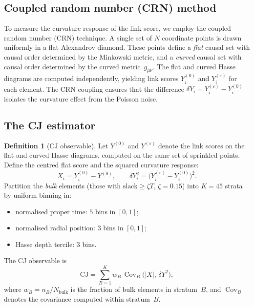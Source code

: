 \documentclass[12pt,a4paper]{article}
\theoremstyle{plain}
\theoremstyle{definition}
\newtheorem{definition}[theorem]{Definition}
\theoremstyle{remark}
\newcommand{\Cov}{\operatorname{Cov}}
\newcommand{\CJ}{\mathrm{CJ}}
\begin{document}
\subsection{Coupled random number (CRN) method}
\label{sec:crn}

To measure the curvature response of the link score, we employ
the coupled random number (CRN) technique.  A single set of $N$
coordinate points is drawn uniformly in a flat Alexandrov diamond.
These points define a \emph{flat} causal set with causal order
determined by the Minkowski metric, and a \emph{curved} causal set
with causal order determined by the curved metric~$g_{\mu\nu}$.  The
flat and curved Hasse diagrams are computed independently, yielding
link scores $Y_i^{(0)}$ and $Y_i^{(\varepsilon)}$ for each element.
The CRN coupling ensures that the difference
$\delta Y_i = Y_i^{(\varepsilon)} - Y_i^{(0)}$ isolates the
curvature effect from the Poisson noise.

\subsection{The CJ estimator}
\label{sec:cjdef}

\begin{definition}[CJ observable]
\label{def:CJ}
Let $Y^{(0)}$ and $Y^{(\varepsilon)}$ denote the link scores on
the flat and curved Hasse diagrams, computed on the same set of
sprinkled points.  Define the centred flat score and the squared
curvature response:
\begin{equation}\label{eq:XdY}
  X_i = Y_i^{(0)} - \overline{Y^{(0)}},
  \qquad
  \delta Y_i^2 = \bigl(Y_i^{(\varepsilon)} - Y_i^{(0)}\bigr)^2.
\end{equation}
Partition the \emph{bulk} elements (those with
$\mathrm{slack} \geq \zeta T$, $\zeta = 0.15$) into $K = 45$
strata by uniform binning in:
\begin{itemize}
\item normalised proper time: $5$ bins in $[0,1]$;
\item normalised radial position: $3$ bins in $[0,1]$;
\item Hasse depth tercile: $3$ bins.
\end{itemize}
The CJ observable is
\begin{equation}\label{eq:CJ-def}
  \CJ = \sum_{B=1}^{K} w_B\, \Cov_B\!\bigl(|X|,\, \delta Y^2\bigr),
\end{equation}
where $w_B = n_B / N_{\mathrm{bulk}}$ is the fraction of bulk
elements in stratum~$B$, and $\Cov_B$ denotes the covariance
computed within stratum~$B$.
\end{definition}
\end{document}

